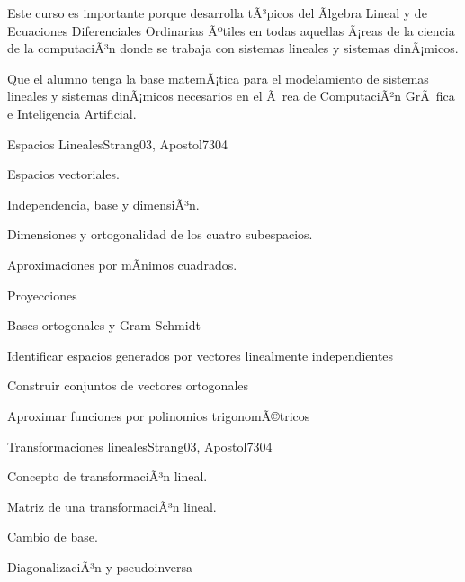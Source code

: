 \begin{syllabus}


\begin{justification}
Este curso es importante porque desarrolla tÃ³picos del Ãlgebra Lineal y de Ecuaciones Diferenciales Ordinarias Ãºtiles en todas aquellas Ã¡reas de la ciencia de la computaciÃ³n donde se trabaja con sistemas lineales y sistemas dinÃ¡micos.
\end{justification}

\begin{goals}
\item Que el alumno tenga la base matemÃ¡tica para el modelamiento de sistemas lineales y sistemas dinÃ¡micos necesarios en el Ã rea de ComputaciÃ²n GrÃ fica e Inteligencia Artificial.
\end{goals}

\begin{outcomes}
\end{outcomes}

\begin{unit}{Espacios Lineales}{Strang03, Apostol73}{0}{4}
\begin{topics}
      \item Espacios vectoriales.
      \item Independencia, base y dimensiÃ³n.
      \item Dimensiones y ortogonalidad de los cuatro subespacios.
      \item Aproximaciones por mÃ­nimos cuadrados.
      \item Proyecciones
      \item Bases ortogonales y Gram-Schmidt
   \end{topics}

   \begin{learningoutcomes}
      \item Identificar espacios generados por vectores linealmente independientes
      \item Construir conjuntos de vectores ortogonales
      \item Aproximar funciones por polinomios trigonomÃ©tricos
   \end{learningoutcomes}
\end{unit}

\begin{unit}{Transformaciones lineales}{Strang03, Apostol73}{0}{4}
\begin{topics}
      \item Concepto de transformaciÃ³n lineal.
      \item Matriz de una transformaciÃ³n lineal.
      \item Cambio de base.
      \item DiagonalizaciÃ³n y pseudoinversa
   \end{topics}


\end{unit}
\end{syllabus}
